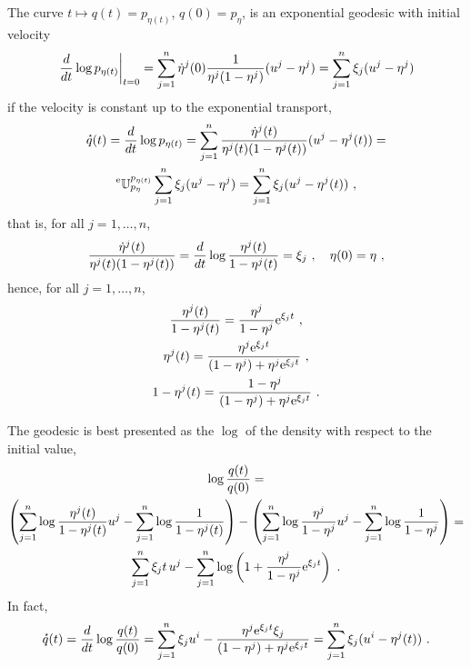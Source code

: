 \documentclass[12pt,a4paper]{amsart}
\begin{document}
The curve $t \mapsto q(t) = p_{\eta(t)}$, $q(0) = p_{\eta}$, is an exponential geodesic with initial velocity
\begin{equation}
  \label{eq:50}
\left. \frac{d}{dt} \log p_{\eta(t)} \right|_{t=0} = \sum_{j=1}^n \dot \eta^j(0) \frac{1}{\eta^j(1 - \eta^j)} (u^j - \eta^j) = \sum_{j=1}^n \xi_j (u^j - \eta^j)
\end{equation}
if the velocity is constant up to the exponential transport,
\begin{multline}
  \label{eq:15a}
\accentset{\star}{q}(t) = \frac{d}{dt} \log p_{\eta(t)} =  \sum_{j=1}^n \frac{\dot \eta^j(t)}{\eta^j(t)(1 - \eta^j(t))} (u^j - \eta^j(t)) = \\ \prescript{\text{e}}{} {\mathbb U} _ {p_\eta} ^ {p_{\eta(t)}} \sum_{j=1}^n \xi_j (u^j - \eta^j) = \sum_{j=1}^n \xi_j (u^j - \eta^j(t)) \ ,  
\end{multline}
that is, for all $j = 1,\dots,n$,
\begin{equation}
  \label{eq:16a}
  \frac {\dot \eta^j(t)} {\eta^j(t)(1-\eta^j(t))} = \derivby t \log \frac {\eta^j(t)} {1-\eta^j(t)} = \xi_j \ , \quad  \eta(0) = \eta \ ,
\end{equation}
hence, for all $j=1,\dots, n$,
\begin{gather}
  \label{eq:35}
  \frac{\eta^j(t)}{1-\eta^j(t)} = \frac{\eta^j}{1-\eta^j}\mathrm{e}^{\xi_j t} \ , \\
  \label{eq:33}
\eta^j(t) = \frac{\eta^j\mathrm{e}^{\xi_jt}} {(1-\eta^j) + \eta^j\mathrm{e}^{\xi_jt}} \ , \\  
  \label{eq:34}
  1 - \eta^j(t) = \frac{1 - \eta^j} {(1-\eta^j) + \eta^j\mathrm{e}^{\xi_jt}} \ .
\end{gather}

The geodesic is best presented as the $\log$ of the density with respect to the initial value,
\begin{multline}
  \label{eq:36}
  \log\frac{q(t)}{q(0)} = \\
  \left(\sum_{j=1}^n \log \frac {\eta^j(t)}{1 - \eta^j(t)} u^j - \sum_{j=1}^n \log \frac 1 {1 - \eta^j(t)}\right) - \left(\sum_{j=1}^n \log \frac {\eta^j}{1-\eta^j} u^j- \sum_{j=1}^n \log \frac 1 {1 - \eta^j} \right) = \\ \sum_{j=1}^n \xi_jt\, u^j - \sum_{j=1}^n \log\left(1 + \frac{\eta^j}{1-\eta^j}\mathrm{e}^{\xi_jt}\right) \ .
\end{multline}
In fact,
\begin{equation}
  \label{eq:37}
  \velocity q(t) = \derivby t \log \frac{q(t)}{q(0)} = \sum_{j=1}^n \xi_j u^i - \frac{\eta^j \euler^{\xi_j t} \xi_j}{(1-\eta^j)+\eta^j \euler^{\xi_j t}} = \sum_{j=1}^n \xi_j (u^i - \eta^j(t)) \ .
\end{equation}
\end{document}
